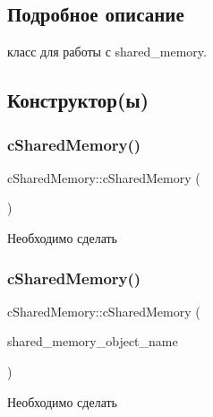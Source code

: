 \subsection{Подробное описание}
класс для работы с shared\+\_\+memory. 

\subsection{Конструктор(ы)}
\mbox{\label{classc_shared_memory_a7204cac49fd1f5d8581c6b448e2a67aa}} 
\subsubsection{\texorpdfstring{c\+Shared\+Memory()}{cSharedMemory()}\hspace{0.1cm}{\footnotesize\ttfamily [1/2]}}
{\footnotesize\ttfamily c\+Shared\+Memory\+::c\+Shared\+Memory (\begin{DoxyParamCaption}{ }\end{DoxyParamCaption})}

\begin{DoxyRefDesc}{Необходимо сделать}
\item[\hyperlink{todo__todo000001}{Необходимо сделать}]\end{DoxyRefDesc}
\mbox{\label{classc_shared_memory_ac9af9431ca45ead28b60b5913214fba5}} 
\subsubsection{\texorpdfstring{c\+Shared\+Memory()}{cSharedMemory()}\hspace{0.1cm}{\footnotesize\ttfamily [2/2]}}
{\footnotesize\ttfamily c\+Shared\+Memory\+::c\+Shared\+Memory (\begin{DoxyParamCaption}\item[{const char $\ast$}]{shared\+\_\+memory\+\_\+object\+\_\+name }\end{DoxyParamCaption})\hspace{0.3cm}{\ttfamily [inline]}}

\begin{DoxyRefDesc}{Необходимо сделать}
\item[\hyperlink{todo__todo000002}{Необходимо сделать}]\end{DoxyRefDesc}


